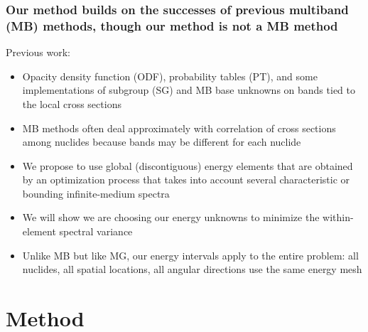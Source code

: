 \documentclass[compress,10pt]{beamer}
\begin{document}
\typeout{***********************************************************************************}

\begin{frame}
    \frametitle{Our method builds on the successes of previous multiband (MB) methods, though our method is \textbf{not} a MB method}

   \begin{block}{Previous work:}
   \begin{itemize}
       \item Opacity density function (ODF), probability tables (PT), and some implementations of subgroup (SG) and MB base unknowns on bands tied to the local cross sections
       \item MB methods often deal approximately with correlation of cross sections among nuclides because bands may be different for each nuclide
       \item We propose to use global (discontiguous) energy elements that are obtained by an optimization process that takes into account several characteristic or bounding infinite-medium spectra
       \item We will show we are choosing our energy unknowns to minimize the within-element spectral variance
       \item Unlike MB but like MG, our energy intervals apply to the entire problem: all nuclides, all spatial locations, all angular directions use the same energy mesh
   \end{itemize}
   \end{block}

\end{frame}

%
\section{Method}
\subsection{}
\end{document}
